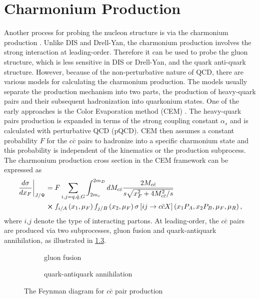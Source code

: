 \documentclass[../main.tex]{subfiles}
\begin{document}
\chapter{Charmonium Production}
\label{ch:jpsi}
Another process for probing the nucleon structure is via the charmonium production \cite{peng1995,chang2020}.
Unlike DIS and Drell-Yan, the charmonium production involves the strong interaction
at leading-order. Therefore it can be used to probe the gluon structure, which is
less sensitive in DIS or Drell-Yan, and the quark anti-quark structure. However,
because of the non-perturbative nature of QCD, there are various models for
calculating the charmonium production. The models usually separate the production
mechanism into two parts, the production of heavy-quark pairs and their subsequent
hadronization into quarkonium states. One of the early approaches is the Color
Evaporation method (CEM) \cite{einhorn1975,bodwin1995}. The heavy-quark
pairs production is expanded in terms of the strong coupling constant $\alpha_s$
and is calculated with perturbative QCD (pQCD). CEM then assumes a constant
probability $F$ for the $c\bar{c}$ pairs to hadronize into a specific charmonium
state and this probability is independent of the kinematics or the production
subprocess. The charmonium production cross section in the CEM framework can be
expressed as
\begin{equation}
	\begin{split}
		\left.\frac{d\sigma}{dx_F}\right|_{J/\Psi} &= F \sum_{i,j = q,\bar{q},G}\int^{2m_D}_{2m_c} dM_{c\bar{c}}  \frac{2M_{c\bar{c}}}{s\sqrt{x_F^2+4M_{c\bar{c}}^2/s}}\\
		&\cross f_{i/A}\left(x_1,\mu_F\right)f_{j/B}\left(x_2,\mu_F\right)\sigma\left[ij\rightarrow c\bar{c}X\right]\left(x_1P_A,x_2P_B,\mu_F,\mu_R \right),
	\end{split}
\end{equation}
where $i$,$j$ denote the type of interacting partons. At leading-order, the
$c\bar{c}$ pairs are produced via two subprocesses, gluon fusion and
quark-antiquark annihilation, as illustrated in \cref{fig:charmonium}.
\begin{figure}[htpb!]
	\centering
	\begin{subfigure}{0.4\linewidth}
		\begin{subfigure}{\linewidth}
			
		\end{subfigure}
		\begin{subfigure}{\linewidth}
			
		\end{subfigure}
		\caption{gluon fusion\label{subfig:gluon}}
	\end{subfigure}
	\quad
	\begin{subfigure}{0.4\linewidth}
		
		\caption{quark-antiquark annihilation\label{subfig:qqbar}}
	\end{subfigure}
	\caption{The Feynman diagram for $c\bar{c}$ pair production}
	\label{fig:charmonium}
\end{figure}
\end{document}
